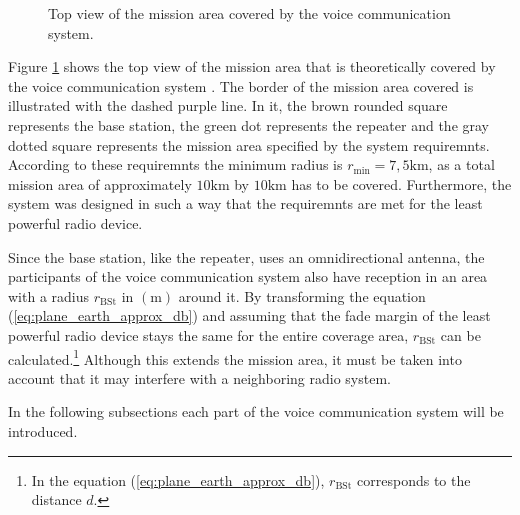 \begin{figure}[h!]
	\centering
	
	\caption{Top view of the mission area covered by the voice communication system.}
	\label{fig:tikz_range}
\end{figure}
Figure \ref{fig:tikz_range} shows the top view of the mission area that is theoretically covered by the voice communication system \cite{Lange:1992}. The border of the mission area covered is illustrated with the dashed purple line. In it, the brown rounded square represents the base station, the green dot represents the repeater and the gray dotted square represents the mission area specified by the system requiremnts. According to these requiremnts the minimum radius is $r_\mathrm{min} = 7,5\mathrm{km}$, as a total mission area of approximately $10\mathrm{km}$ by $10\mathrm{km}$ has to be covered. Furthermore, the system was designed in such a way that the requiremnts are met for the least powerful radio device. 

Since the base station, like the repeater, uses an omnidirectional antenna, the participants of the voice communication system also have reception in an area with a radius $r_\mathrm{BSt}$ in $\left(\mathrm{m}\right)$ around it. By transforming the equation (\ref{eq:plane_earth_approx_db}) and assuming that the fade margin of the least powerful radio device stays the same for the entire coverage area, $r_\mathrm{BSt}$  can be calculated.\footnote{In the equation (\ref{eq:plane_earth_approx_db}), $r_\mathrm{BSt}$ corresponds to the distance $d$.} Although this extends the mission area, it must be taken into account that it may interfere with a neighboring radio system.

In the following subsections each part of the voice communication system will be introduced.






